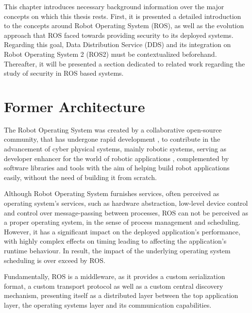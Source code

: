 This chapter introduces necessary background information over the major concepts on which this thesis rests. First, it is presented a detailed introduction to the concepts around Robot Operating System (ROS), as well as the evolution approach that ROS faced towards providing security to its deployed systems. Regarding this goal, Data Distribution Service (DDS) and its integration on Robot Operating System 2 (ROS2) must be contextualized beforehand. Thereafter, it will be presented a section dedicated to related work regarding the study of security in ROS based systems.


\section{Former Architecture}

The Robot Operating System was created by a collaborative open-source community, that has undergone rapid development \cite{cousins2011exponential}, to contribute in the advancement of cyber physical systems, mainly robotic systems, serving as developer enhancer for the world of robotic applications \cite{diluoffo2018robot}, complemented by software libraries and tools with the aim of helping build robot applications easily, without the need of building it from scratch.

Although Robot Operating System furnishes services, often perceived as operating system's services, such as hardware abstraction, low-level device control and control over message-passing between processes, ROS can not be perceived as a proper operating system, in the sense of process management and scheduling. However, it has a significant impact on the deployed application's performance, with highly complex effects on timing leading to affecting the application's runtime behaviour. In result, the impact of the underlying operating system scheduling is over exceed by ROS. \cite{intro-ros, casini2019response} 

Fundamentally, ROS is a middleware, as it provides a custom serialization format, a custom transport protocol as well as a custom central discovery mechanism, presenting itself as a distributed layer between the top application layer, the operating systems layer and its communication capabilities. 

